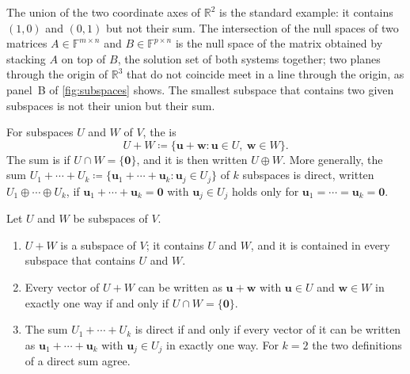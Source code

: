 The union of the two coordinate axes of $\mathbb R^2$ is the standard example: it contains $(1,0)$ and $(0,1)$ but not their sum. The intersection of the null spaces of two matrices $A\in\mathbb F^{m\times n}$ and $B\in\mathbb F^{p\times n}$ is the null space of the matrix obtained by stacking $A$ on top of $B$, the solution set of both systems together; two planes through the origin of $\mathbb R^3$ that do not coincide meet in a line through the origin, as panel~B of \cref{fig:subspaces} shows. The smallest subspace that contains two given subspaces is not their union but their sum.

\begin{definition}
\label{def:sum}
For subspaces $U$ and $W$ of $V$, the  is
\[
U+W\coloneqq\{\mathbf u+\mathbf w: \mathbf u\in U,\ \mathbf w\in W\}.
\]
The sum is  if $U\cap W=\{\mathbf 0\}$, and it is then written $U\oplus W$. More generally, the sum $U_1+\cdots+U_k\coloneqq\{\mathbf u_1+\cdots+\mathbf u_k: \mathbf u_j\in U_j\}$ of $k$ subspaces is direct, written $U_1\oplus\cdots\oplus U_k$, if $\mathbf u_1+\cdots+\mathbf u_k=\mathbf 0$ with $\mathbf u_j\in U_j$ holds only for $\mathbf u_1=\cdots=\mathbf u_k=\mathbf 0$.
\end{definition}

\begin{theorem}
\label{thm:direct-sum}
Let $U$ and $W$ be subspaces of $V$.
\begin{enumerate}
\item $U+W$ is a subspace of $V$; it contains $U$ and $W$, and it is contained in every subspace that contains $U$ and $W$.
\item Every vector of $U+W$ can be written as $\mathbf u+\mathbf w$ with $\mathbf u\in U$ and $\mathbf w\in W$ in exactly one way if and only if $U\cap W=\{\mathbf 0\}$.
\item The sum $U_1+\cdots+U_k$ is direct if and only if every vector of it can be written as $\mathbf u_1+\cdots+\mathbf u_k$ with $\mathbf u_j\in U_j$ in exactly one way. For $k=2$ the two definitions of a direct sum agree.
\end{enumerate}
\end{theorem}

